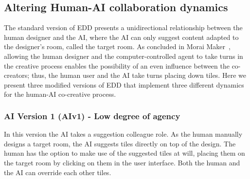 \subsection{Altering Human-AI collaboration dynamics}



The standard version of EDD presents a unidirectional relationship between the human designer and the AI, where the AI can only suggest content adapted to the designer's room, called the target room. As concluded in Morai Maker~\cite{p13guzdial_co-creative_2018}, allowing the human designer and the computer-controlled agent to take turns in the creative process enables the possibility of an even influence between the co-creators; thus, the human user and the AI take turns placing down tiles. Here we present three modified versions of EDD that implement three different dynamics for the human-AI co-creative process. %





\subsubsection{AI Version 1 (AIv1) - Low degree of agency} 

In this version the AI takes a suggestion colleague role. As the human manually designs a target room, the AI suggests tiles directly on top of the design. The human has the option to make use of the suggested tiles at will, placing them on the target room by clicking on them in the user interface. Both the human and the AI can override each other tiles.



